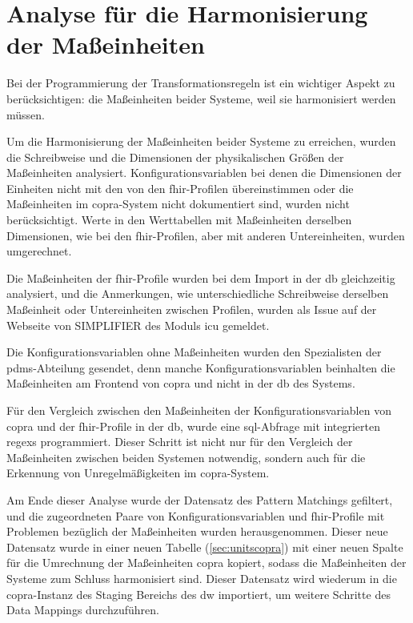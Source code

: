 \section{Analyse für die Harmonisierung der Maßeinheiten} \label{sec:units}

Bei der Programmierung der Transformationsregeln ist ein wichtiger Aspekt zu berücksichtigen: die Maßeinheiten beider Systeme, weil sie harmonisiert werden müssen. 

Um die Harmonisierung der Maßeinheiten beider Systeme zu erreichen, wurden die Schreibweise und die Dimensionen der physikalischen Größen der Maßeinheiten analysiert. Konfigurationsvariablen bei denen die Dimensionen der Einheiten nicht mit den von den \ac{fhir}-Profilen übereinstimmen oder die Maßeinheiten im \ac{copra}-System nicht dokumentiert sind, wurden nicht berücksichtigt. Werte in den Werttabellen mit Maßeinheiten derselben Dimensionen, wie bei den \ac{fhir}-Profilen, aber mit anderen Untereinheiten, wurden umgerechnet.

Die Maßeinheiten der \ac{fhir}-Profile wurden bei dem Import in der \ac{db} gleichzeitig analysiert, und die Anmerkungen, wie unterschiedliche Schreibweise derselben Maßeinheit oder Untereinheiten zwischen Profilen, wurden als Issue auf der Webseite von SIMPLIFIER des Moduls \glqq\ac{icu}\grqq{} gemeldet.

Die Konfigurationsvariablen ohne Maßeinheiten wurden den Spezialisten der \ac{pdms}-Abteilung gesendet, denn manche Konfigurationsvariablen beinhalten die Maßeinheiten am Frontend von \ac{copra} und nicht in der \ac{db} des Systems.

Für den Vergleich zwischen den Maßeinheiten der Konfigurationsvariablen von \ac{copra} und der \ac{fhir}-Profile in der \ac{db}, wurde eine \ac{sql}-Abfrage mit integrierten \acp{regex} programmiert. Dieser Schritt ist nicht nur für den Vergleich der Maßeinheiten zwischen beiden Systemen notwendig, sondern auch für die Erkennung von Unregelmäßigkeiten im \ac{copra}-System.

Am Ende dieser Analyse wurde der Datensatz des Pattern Matchings gefiltert, und die zugeordneten Paare von Konfigurationsvariablen und \ac{fhir}-Profile mit Problemen bezüglich der Maßeinheiten wurden herausgenommen. Dieser neue Datensatz wurde in einer neuen Tabelle (\ref{sec:unitscopra}) mit einer neuen Spalte für die Umrechnung der Maßeinheiten \ac{copra} kopiert, sodass die Maßeinheiten der Systeme zum Schluss harmonisiert sind. Dieser Datensatz wird wiederum in die \ac{copra}-Instanz des Staging Bereichs des \ac{dw} importiert, um weitere Schritte des Data Mappings durchzuführen.